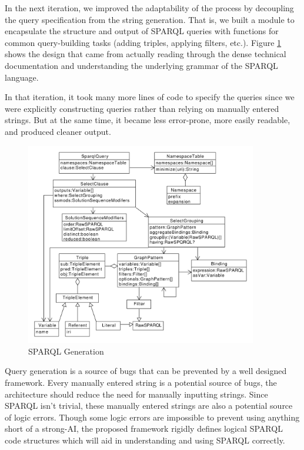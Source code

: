 \documentclass[11pt]{article}
\begin{document}
In the next iteration, we improved the adaptability of the process by 
decoupling the query specification from the string generation. 
That is, we built a module to encapsulate the structure and output of SPARQL
queries with functions for common query-building tasks (adding triples, 
applying filters, etc.). Figure \ref{fig:sparql_gen} shows the design that came from
actually reading through the dense technical documentation and understanding the
underlying grammar of the SPARQL language.

In that iteration, it took many more lines of code to specify the queries since
we were explicitly constructing queries rather than relying on manually
entered strings. But at the same time, it became less error-prone, more
easily readable, and produced cleaner output.

\begin{figure}[h!]
    \centering
    \includegraphics[width=0.9\textwidth,natwidth=1,natheight=1]{umlet/sparql.pdf}
    \caption{SPARQL Generation \cite{sparql, sparql11}}
    \label{fig:sparql_gen}
\end{figure}

Query generation is a source of bugs that can be prevented by a well
designed framework. Every manually entered string is a potential source of bugs, the
architecture should reduce the need for manually inputting strings. Since SPARQL isn't
trivial, these manually entered strings are also a potential source
of logic errors. Though some logic errors are impossible to prevent using anything short of
a strong-AI, the proposed framework rigidly defines logical SPARQL code structures which
will aid in understanding and using SPARQL correctly. 
\end{document}
